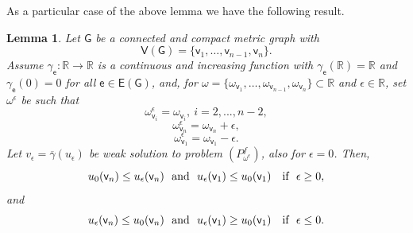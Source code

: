 \documentclass[reqno,12pt]{amsart}
\newtheorem{lemma}[theorem]{Lemma} %
\def\R{\mathbb R} %
\def\e{\mathsf{e}} 	%
\def\v{\mathsf{v}}	%
\newcommand{\G}{\mathsf{G}}	%
\newcommand{\V}{\mathsf{V}}	%
\newcommand{\E}{\mathsf{E}}	%
\numberwithin{equation}{section} %
\begin{document}
  As a particular case  of the above lemma we have the following result. 

\begin{lemma}\label{030326_002}   Let  $\G$ be a  connected and compact metric graph with $$\V(\G) = \{ \v_1, \ldots, \v_{n-1},\v_n \}.$$
Assume $\gamma_\e:\mathbb{R}\to \mathbb{R}$ is a  continuous and increasing function with 
$\gamma_\e(\mathbb{R})=\mathbb{R}$ and $\gamma_\e(0)=0$ for all $\e \in \E(\G)$, and, for $\omega=\{\omega_{\v_1}, \ldots, \omega_{\v_{n-1}},\omega_{\v_n}  \} \subset \R$ and $\epsilon\in \R$,  set $\omega^\epsilon$ be such that $$\omega^\epsilon_{\v_i}=\omega_{\v_i}, \ i=2,...,n-2,$$ 
$$\omega^\epsilon_{\v_n}=\omega_{\v_n}+\epsilon,$$
$$\omega^\epsilon_{\v_1}=\omega_{\v_1}-\epsilon.$$
  Let $v_\epsilon = \overline{\gamma}(u_\epsilon)$ be weak solution  to problem $(P_{\omega^\epsilon}^f)$, also for $\epsilon=0$.
 Then, 
 $$u _0(\v_n) \le u_\epsilon(\v_n) \ \hbox{ and }\   u_\epsilon(\v_1)\leq  u_0(\v_1)  \quad \hbox{if } \   \epsilon \ge 0,
 $$
 and 
 $$u_\epsilon(\v_n)\le u_0(\v_n)    \ \hbox{ and }\  u_\epsilon(\v_1)\ge u_0(\v_1)  \quad \hbox{if } \   \epsilon \le 0.$$
 \end{lemma}
\end{document}
